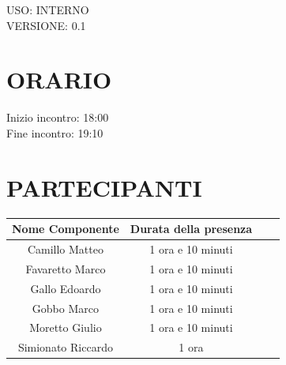 \documentclass[5pt]{article}
\begin{document}
\begin{flushright}
    \begin{spacing}{1}
        USO: INTERNO\\
        VERSIONE: 0.1\\ %
    \end{spacing}
\end{flushright}


\restoregeometry

\pagebreak


\section{\Large ORARIO}
\begin{spacing}{1.5}
    {\large Inizio incontro: 18:00}\\
    {\large Fine incontro: 19:10}
\end{spacing}

\section{PARTECIPANTI}
\setlength\cellspacetoplimit{6pt}
\setlength\cellspacebottomlimit{6pt}

\begin{table}[ht]
  \begin{tabular}{|Sc|Sc|}
    \hline
    \textbf{Nome Componente} & \textbf{Durata della presenza} \\
    \hline
    Camillo Matteo & 1 ora e 10 minuti \\
    Favaretto Marco & 1 ora e 10 minuti \\
    Gallo Edoardo & 1 ora e 10 minuti \\
    Gobbo Marco & 1 ora e 10 minuti \\
    Moretto Giulio & 1 ora e 10 minuti \\
    Simionato Riccardo & 1 ora \\
    \hline
  \end{tabular}
  \label{tab:conference}
\end{table}
\end{document}
